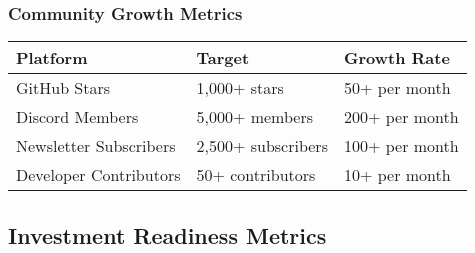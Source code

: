 \documentclass[12pt,a4paper]{article}
\begin{document}
\subsubsection{Community Growth Metrics}
\begin{center}
\begin{tabular}{|l|l|l|}
\hline
\textbf{Platform} & \textbf{Target} & \textbf{Growth Rate} \\
\hline
GitHub Stars & 1,000+ stars & 50+ per month \\
\hline
Discord Members & 5,000+ members & 200+ per month \\
\hline
Newsletter Subscribers & 2,500+ subscribers & 100+ per month \\
\hline
Developer Contributors & 50+ contributors & 10+ per month \\
\hline
\end{tabular}
\end{center}

\subsection{Investment Readiness Metrics}
\end{document}
